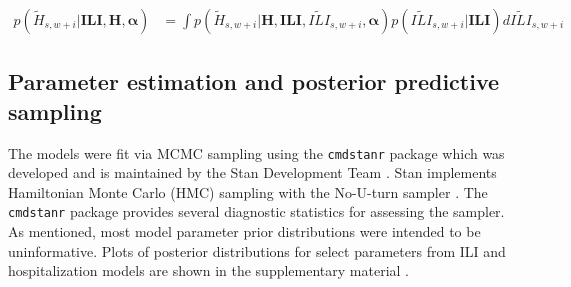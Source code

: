 \begin{equation}
\begin{aligned}
\label{eq:hosp_post_forc}
    p(\tilde{H}_{s,w + i} | \textbf{ILI}, \textbf{H}, \boldsymbol{\alpha}) &= 
       \int p(\tilde{H}_{s,w + i} | \textbf{H}, \textbf{ILI}, 
       \widetilde{ILI}_{s,w + i}, \boldsymbol{\alpha}) 
       p(\widetilde{ILI}_{s,w + i} | \textbf{ILI}) d\widetilde{ILI}_{s,w + i}
\end{aligned}
\end{equation}





 
   











\subsection{Parameter estimation and posterior predictive sampling}
\label{sec:implementation_posterior}

The models were fit via MCMC sampling using the 
\texttt{cmdstanr} package which was developed and is maintained by the Stan 
Development Team \cite[]{stan2024manual} \cite[]{gabry2022stan}. Stan 
implements Hamiltonian Monte Carlo (HMC) sampling with the No-U-turn 
sampler \cite[]{hoffman2014no}. The \texttt{cmdstanr} package provides 
several diagnostic statistics for assessing the sampler.
As mentioned, most model parameter prior distributions were intended to be 
uninformative.
Plots of posterior distributions for select parameters from ILI and 
hospitalization models are shown in the supplementary material 
\cite[]{wadsworth2024bas}.

